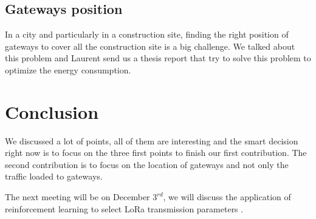 \subsection{Gateways position}

In a city and particularly in a construction site,
	finding the right position of gateways to cover all the construction site is a big challenge.
We talked about this problem and Laurent send us a thesis report that try to solve this problem to optimize the energy consumption.
\section{Conclusion}

We discussed a lot of points,
	all of them are interesting and the smart decision right now is to focus on the three first points to finish our first contribution.
The second contribution is to focus on the location of gateways and not only the traffic loaded to gateways.

The next meeting will be on December $3^{rd}$,
	we will discuss the application of reinforcement learning to select LoRa transmission parameters \cite{chincoli_self-learning_2018} \cite{bonnefoi_multiarmed_2017}.

